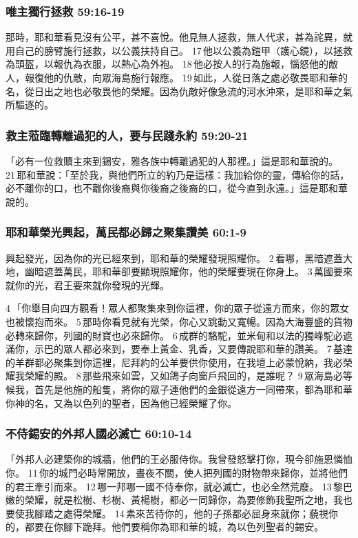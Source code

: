 \subsubsection{唯主獨行拯救 59:16-19}
那時，耶和華看見沒有公平，甚不喜悅。他見無人拯救，無人代求，甚為詫異，就用自己的膀臂施行拯救，以公義扶持自己。 17 他以公義為鎧甲（護心鏡），以拯救為頭盔，以報仇為衣服，以熱心為外袍。 18 他必按人的行為施報，惱怒他的敵人，報復他的仇敵，向眾海島施行報應。 19 如此，人從日落之處必敬畏耶和華的名，從日出之地也必敬畏他的榮耀。因為仇敵好像急流的河水沖來，是耶和華之氣所驅逐的。


\subsubsection{救主蒞臨轉離過犯的人，要与民踐永約 59:20-21}
「必有一位救贖主來到錫安，雅各族中轉離過犯的人那裡。」這是耶和華說的。 21 耶和華說：「至於我，與他們所立的約乃是這樣：我加給你的靈，傳給你的話，必不離你的口，也不離你後裔與你後裔之後裔的口，從今直到永遠。」這是耶和華說的。

\subsubsection{耶和華榮光興起，萬民都必歸之聚集讚美 60:1-9}
興起發光，因為你的光已經來到，耶和華的榮耀發現照耀你。 2 看哪，黑暗遮蓋大地，幽暗遮蓋萬民，耶和華卻要顯現照耀你，他的榮耀要現在你身上。 3 萬國要來就你的光，君王要來就你發現的光輝。

4 「你舉目向四方觀看！眾人都聚集來到你這裡，你的眾子從遠方而來，你的眾女也被懷抱而來。 5 那時你看見就有光榮，你心又跳動又寬暢。因為大海豐盛的貨物必轉來歸你，列國的財寶也必來歸你。 6 成群的駱駝，並米甸和以法的獨峰駝必遮滿你，示巴的眾人都必來到，要奉上黃金、乳香，又要傳說耶和華的讚美。 7 基達的羊群都必聚集到你這裡，尼拜約的公羊要供你使用，在我壇上必蒙悅納，我必榮耀我榮耀的殿。 8 那些飛來如雲，又如鴿子向窗戶飛回的，是誰呢？ 9 眾海島必等候我，首先是他施的船隻，將你的眾子連他們的金銀從遠方一同帶來，都為耶和華你神的名，又為以色列的聖者，因為他已經榮耀了你。

\subsubsection{不侍錫安的外邦人國必滅亡 60:10-14}
「外邦人必建築你的城牆，他們的王必服侍你。我曾發怒擊打你，現今卻施恩憐恤你。 11 你的城門必時常開放，晝夜不關，使人把列國的財物帶來歸你，並將他們的君王牽引而來。 12 哪一邦哪一國不侍奉你，就必滅亡，也必全然荒廢。 13 黎巴嫩的榮耀，就是松樹、杉樹、黃楊樹，都必一同歸你，為要修飾我聖所之地，我也要使我腳踏之處得榮耀。 14 素來苦待你的，他的子孫都必屈身來就你；藐視你的，都要在你腳下跪拜。他們要稱你為耶和華的城，為以色列聖者的錫安。

